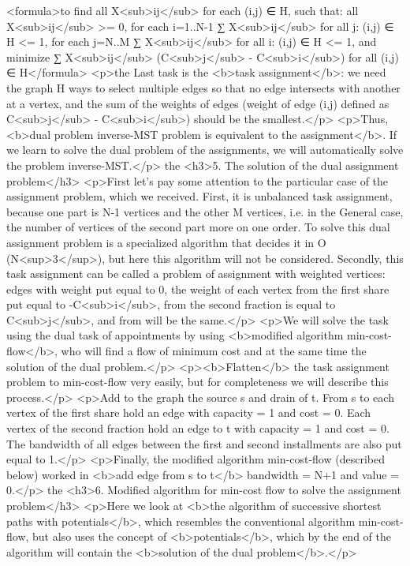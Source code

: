 <formula>to find all X<sub>ij</sub> for each (i,j) ∈ H, such that:
all X<sub>ij</sub> >= 0,
for each i=1..N-1 ∑ X<sub>ij</sub> for all j: (i,j) ∈ H <= 1,
for each j=N..M ∑ X<sub>ij</sub> for all i: (i,j) ∈ H <= 1,
and minimize ∑ X<sub>ij</sub> (C<sub>j</sub> - C<sub>i</sub>) for all (i,j) ∈ H</formula>
<p>the Last task is the <b>task assignment</b>: we need the graph H ways to select multiple edges so that no edge intersects with another at a vertex, and the sum of the weights of edges (weight of edge (i,j) defined as C<sub>j</sub> - C<sub>i</sub>) should be the smallest.</p>
<p>Thus, <b>dual problem inverse-MST problem is equivalent to the assignment</b>. If we learn to solve the dual problem of the assignments, we will automatically solve the problem inverse-MST.</p>
the <h3>5. The solution of the dual assignment problem</h3>
<p>First let's pay some attention to the particular case of the assignment problem, which we received. First, it is unbalanced task assignment, because one part is N-1 vertices and the other M vertices, i.e. in the General case, the number of vertices of the second part more on one order. To solve this dual assignment problem is a specialized algorithm that decides it in O (N<sup>3</sup>), but here this algorithm will not be considered. Secondly, this task assignment can be called a problem of assignment with weighted vertices: edges with weight put equal to 0, the weight of each vertex from the first share put equal to -C<sub>i</sub>, from the second fraction is equal to C<sub>j</sub>, and from will be the same.</p>
<p>We will solve the task using the dual task of appointments by using <b>modified algorithm min-cost-flow</b>, who will find a flow of minimum cost and at the same time the solution of the dual problem.</p>
<p><b>Flatten</b> the task assignment problem to min-cost-flow very easily, but for completeness we will describe this process.</p>
<p>Add to the graph the source s and drain of t. From s to each vertex of the first share hold an edge with capacity = 1 and cost = 0. Each vertex of the second fraction hold an edge to t with capacity = 1 and cost = 0. The bandwidth of all edges between the first and second installments are also put equal to 1.</p>
<p>Finally, the modified algorithm min-cost-flow (described below) worked in <b>add edge from s to t</b> bandwidth = N+1 and value = 0.</p>
the <h3>6. Modified algorithm for min-cost flow to solve the assignment problem</h3>
<p>Here we look at <b>the algorithm of successive shortest paths with potentials</b>, which resembles the conventional algorithm min-cost-flow, but also uses the concept of <b>potentials</b>, which by the end of the algorithm will contain the <b>solution of the dual problem</b>.</p>
